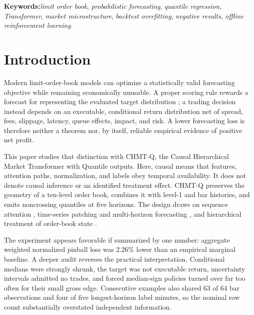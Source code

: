 \documentclass[10pt,letterpaper]{article}
\numberwithin{equation}{section}
\newcommand{\keywords}[1]{\par\addvspace{\baselineskip}\noindent\textbf{Keywords:}\enspace#1}
\theoremstyle{definition}
\theoremstyle{remark}
\begin{document}
\keywords{\emph{limit order book}, \emph{probabilistic forecasting},
\emph{quantile regression}, \emph{Transformer}, \emph{market microstructure},
\emph{backtest overfitting}, \emph{negative results},
\emph{offline reinforcement learning}}

\section{Introduction}

Modern limit-order-book models can optimize a statistically valid forecasting
objective while remaining economically unusable. A proper scoring rule rewards
a forecast for representing the evaluated target distribution
\citep{gneiting2007}; a trading decision instead depends on an executable,
conditional return distribution net of spread, fees, slippage, latency, queue
effects, impact, and risk. A lower forecasting loss is therefore neither a
theorem nor, by itself, reliable empirical evidence of positive net profit.

This paper studies that distinction with CHMT-Q, the Causal Hierarchical Market
Transformer with Quantile outputs. Here, causal means that features, attention
paths, normalization, and labels obey temporal availability. It does not denote
causal inference or an identified treatment effect. CHMT-Q preserves the
geometry of a ten-level order book, combines it with level-1 and bar histories,
and emits noncrossing quantiles at five horizons. The design draws on sequence
attention \citep{vaswani2017,shaw2018}, time-series patching and multi-horizon
forecasting \citep{nie2023,liu2024,lim2021,zeng2023}, and hierarchical treatment
of order-book state
\citep{deepLOB2019,wallbridge2020,zhang2021lob,ntakaris2018,kolm2023,
lucchese2024,briola2025,sirignano2019}.

The experiment appears favorable if summarized by one number: aggregate
weighted normalized pinball loss was 2.26\% lower than an empirical marginal
baseline. A deeper audit reverses the practical interpretation. Conditional
medians were strongly shrunk, the target was not executable return, uncertainty
intervals admitted no trades, and forced median-sign policies turned over far
too often for their small gross edge. Consecutive examples also shared 63 of 64
bar observations and four of five longest-horizon label minutes, so the nominal
row count substantially overstated independent information.
\end{document}
